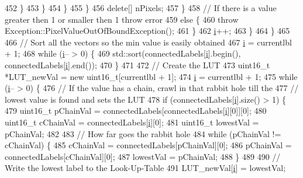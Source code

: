 \begin{DoxyCode}
452               \}
453             \}
454           \}
455         \}
456         \textcolor{keyword}{delete}[] nPixels;
457       \}
458       \textcolor{comment}{// If there is a value greater then 1 or smaller then 1 throw error}
459       \textcolor{keywordflow}{else} \{
460         \textcolor{keywordflow}{throw} Exception::PixelValueOutOfBoundException();
461       \}
462       \hyperlink{_comparision_pictures_2_createtest_image_8m_a6f6ccfcf58b31cb6412107d9d5281426}{i}++;
463     \}
464   \}
465 
466   \textcolor{comment}{// Sort all the vectors so the min value is easily obtained}
467   \hyperlink{_comparision_pictures_2_createtest_image_8m_a6f6ccfcf58b31cb6412107d9d5281426}{i} = currentlbl + 1;
468   \textcolor{keywordflow}{while} (\hyperlink{_comparision_pictures_2_createtest_image_8m_a6f6ccfcf58b31cb6412107d9d5281426}{i}-- > 0) \{
469     std::sort(connectedLabels[\hyperlink{_comparision_pictures_2_createtest_image_8m_a6f6ccfcf58b31cb6412107d9d5281426}{i}].begin(), connectedLabels[\hyperlink{_comparision_pictures_2_createtest_image_8m_a6f6ccfcf58b31cb6412107d9d5281426}{i}].end());
470   \}
471 
472   \textcolor{comment}{// Create the LUT}
473   uint16\_t *LUT\_newVal = \textcolor{keyword}{new} uint16\_t[currentlbl + 1];
474   \hyperlink{_comparision_pictures_2_createtest_image_8m_a6f6ccfcf58b31cb6412107d9d5281426}{i} = currentlbl + 1;
475   \textcolor{keywordflow}{while} (\hyperlink{_comparision_pictures_2_createtest_image_8m_a6f6ccfcf58b31cb6412107d9d5281426}{i}-- > 0) \{
476     \textcolor{comment}{// If the value has a chain, crawl in that rabbit hole till the}
477     \textcolor{comment}{// lowest value is found and sets the LUT}
478     \textcolor{keywordflow}{if} (connectedLabels[\hyperlink{_comparision_pictures_2_createtest_image_8m_a6f6ccfcf58b31cb6412107d9d5281426}{i}].size() > 1) \{
479       uint16\_t pChainVal = connectedLabels[connectedLabels[\hyperlink{_comparision_pictures_2_createtest_image_8m_a6f6ccfcf58b31cb6412107d9d5281426}{i}][0]][0];
480       uint16\_t cChainVal = connectedLabels[\hyperlink{_comparision_pictures_2_createtest_image_8m_a6f6ccfcf58b31cb6412107d9d5281426}{i}][0];
481       uint16\_t lowestVal = pChainVal;
482 
483       \textcolor{comment}{// How far goes the rabbit hole}
484       \textcolor{keywordflow}{while} (pChainVal != cChainVal) \{
485         cChainVal = connectedLabels[pChainVal][0];
486         pChainVal = connectedLabels[cChainVal][0];
487         lowestVal = pChainVal;
488       \}
489 
490       \textcolor{comment}{// Write the lowest label to the Look-Up-Table}
491       LUT\_newVal[\hyperlink{_comparision_pictures_2_createtest_image_8m_a6f6ccfcf58b31cb6412107d9d5281426}{i}] = lowestVal;

\end{DoxyCode}
